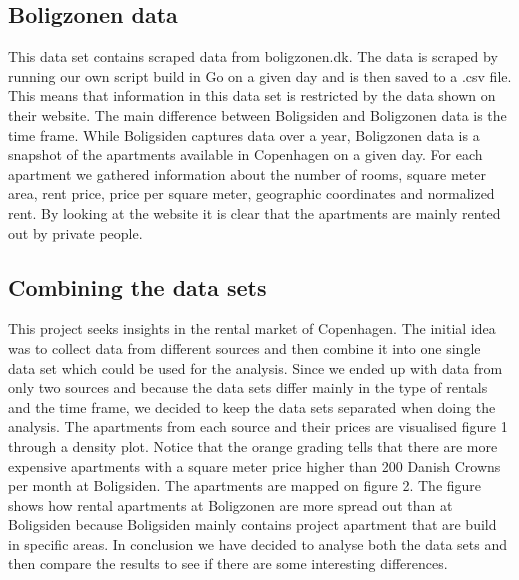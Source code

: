 \documentclass{article}
\begin{document}
\subsection{Boligzonen data}
This data set contains scraped data from boligzonen.dk. The data is scraped by running our own script build in Go on a given day and is then saved to a .csv file. This means that information in this data set is restricted by the data shown on their website. The main difference between Boligsiden and Boligzonen data is the time frame. While Boligsiden captures data over a year, Boligzonen data is a snapshot of the apartments available in Copenhagen on a given day. For each apartment we gathered information about the number of rooms, square meter area, rent price, price per square meter, geographic coordinates and normalized rent. By looking at the website it is clear that the apartments are mainly rented out by private people. 

\subsection{Combining the data sets}
This project seeks insights in the rental market of Copenhagen. The initial idea was to collect data from different sources and then combine it into one single data set which could be used for the analysis. Since we ended up with data from only two sources and because the data sets differ mainly in the type of rentals and the time frame, we decided to keep the data sets separated when doing the analysis. The apartments from each source and their prices are visualised figure 1 through a density plot. Notice that the orange grading tells that there are more expensive apartments with a square meter price higher than 200 Danish Crowns per month at Boligsiden. The apartments are mapped on figure 2. The figure shows how rental apartments at Boligzonen are more spread out than at Boligsiden because Boligsiden mainly contains project apartment that are build in specific areas. In conclusion we have decided to analyse both the data sets and then compare the results to see if there are some interesting differences. 
\end{document}
